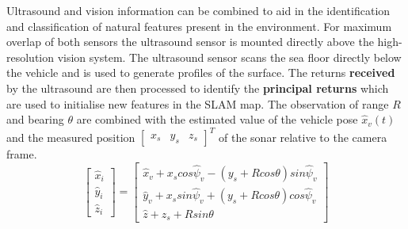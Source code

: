 Ultrasound and vision information can be combined to aid in the identification and classification of natural features present in the environment.
For maximum overlap of both sensors the ultrasound sensor is mounted directly above the high-resolution vision system.
The ultrasound sensor scans the sea floor directly below the vehicle and is used to generate
profiles of the surface.
The returns \textbf{received} by the ultrasound are then processed to identify the \textbf{principal returns} which are used to initialise new features in the SLAM map.
The observation of range $R$ and bearing $\theta$ are combined with the estimated value of the vehicle pose $\hat{x}_v(t)$ and the measured position
$\left[ \begin{array}{ccc} x_s & y_s & z_s \end{array}\right]^T$ of the sonar relative to the camera frame.
\begin{equation}
\left[ {
\begin{array}{c} \hat{x}_i \\ \hat{y}_i \\ \hat{z}_i \end{array}
} \right] =
\left[ {
\begin{array}{c}
	\hat{x}_v + x_s cos \hat{\psi}_v - (y_s + R cos \theta) sin \hat{\psi}_v \\
	\hat{y}_v + x_s sin \hat{\psi}_v + (y_s + R cos \theta) cos \hat{\psi}_v \\
	\hat{z} + z_s + R sin \theta
\end{array}
} \right]
\end{equation}

